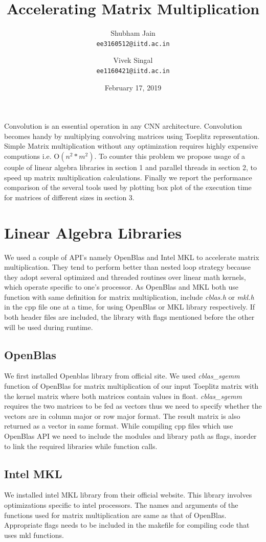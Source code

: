 \documentclass{article}
\title{Accelerating Matrix Multiplication}
\author{Shubham Jain \\ \texttt{ee3160512@iitd.ac.in} \and Vivek Singal \\ \texttt{ee1160421@iitd.ac.in}}
\date{February 17, 2019}
\begin{document}
\maketitle
Convolution is an essential operation in any CNN architecture. Convolution becomes handy by multiplying convolving matrices using Toeplitz\cite{Toeplitz} representation. Simple Matrix multiplication without any optimization requires highly expensive computions i.e. O\((n^2*m^2)\). To counter this problem we propose usage of a couple of  linear algebra libraries in section 1 and parallel threads in section 2, to speed up matrix multiplication calculations. Finally we report the performance comparison of the several tools used by plotting box plot of the execution time for matrices of different sizes in section 3.  
\section{Linear Algebra Libraries}
We used a couple of API's namely OpenBlas and Intel MKL to accelerate matrix multiplication. They tend to perform better than nested loop strategy because they adopt several optimized and threaded routines over linear math kernels, which operate specific to one's processor. 
\newline
As OpenBlas and MKL both use function with same definition for matrix multiplication, include \textit{cblas.h} or \textit{mkl.h} in the cpp file one at a time, for using OpenBlas or MKL library respectively. If both header files are included,  the library with flags mentioned before the other will be used during runtime.        
\subsection{OpenBlas}
We first installed Openblas library from official site\cite{Openblas}. We used \textit{cblas\_sgemm} function of OpenBlas for matrix multiplication of our input Toeplitz matrix with the kernel matrix where both matrices contain values in float. \textit{cblas\_sgemm} requires the two matrices to be fed as vectors thus we need to specify whether the vectors are in column major or row major format. The result matrix is also returned as a vector in same format. While compiling cpp files which use OpenBlas API we need to include the modules and library path as flags, inorder to link the required libraries while function calls.                    
\subsection{Intel MKL}
We installed intel MKL library from their official website\cite{IntelMKL}. This library involves optimizations specific to intel processors. The names and arguments of the functions used for matrix multiplication are same as that of OpenBlas. Appropriate flags needs to be included in the makefile for compiling code that uses mkl functions. 
\end{document}
